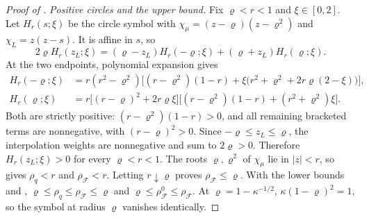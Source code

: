 \documentclass[11pt]{article}
\theoremstyle{definition}
\theoremstyle{remark}
\newcommand{\cF}{\mathcal F}
\newcommand{\rhoF}{\rho_{\cF}}
\newcommand{\rhoz}{\rho_{\cF}^{0}}
\begin{document}
\begin{proof}[Proof of ]
\emph{Positive circles and the upper bound.}  Fix \(\varrho<r<1\) and \(\xi\in[0,2]\).
Let \(H_r(s;\xi)\) be the circle symbol with \(\chi_\mu=(z-\varrho)(z-\varrho^2)\) and \(\chi_L=z(z-s)\).
It is affine in \(s\), so
\[
2\varrho H_r(z_L;\xi)=(\varrho-z_L)H_r(-\varrho;\xi)+(\varrho+z_L)H_r(\varrho;\xi).
\]
At the two endpoints, polynomial expansion gives
\begin{align*}
H_r(-\varrho;\xi)&=r(r^2-\varrho^2)\bigl[(r-\varrho^2)(1-r)+\xi\bigl(r^2+\varrho^2+2r\varrho(2-\xi)\bigr)\bigr],\\
H_r(\varrho;\xi)&=r\bigl[(r-\varrho)^2+2r\varrho\xi\bigr]
\bigl[(r-\varrho^2)(1-r)+(r^2+\varrho^2)\xi\bigr].
\end{align*}
Both are strictly positive: \((r-\varrho^2)(1-r)>0\), and all remaining bracketed terms are nonnegative,
with \((r-\varrho)^2>0\).  Since \(-\varrho\le z_L\le\varrho\), the interpolation weights are nonnegative
and sum to \(2\varrho>0\).  Therefore \(H_r(z_L;\xi)>0\) for every \(\varrho<r<1\).
The roots \(\varrho,\varrho^2\) of \(\chi_\mu\) lie in \(|z|<r\), so  gives
\(\rho_q<r\) and \(\rhoF<r\).  Letting \(r\downarrow\varrho\) proves \(\rhoF\le\varrho\).
With the lower bounds and , \(\varrho\le\rho_q\le\rhoF\le\varrho\) and \(\varrho\le\rhoz\le\rhoF\).
At \(\varrho=1-\kappa^{-1/2}\), \(\kappa(1-\varrho)^2=1\), so the symbol at radius \(\varrho\) vanishes identically.
\end{proof}
\end{document}
